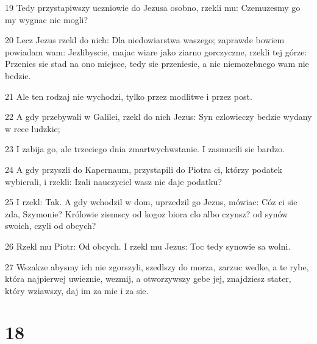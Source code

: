 \par 19 Tedy przystapiwszy uczniowie do Jezusa osobno, rzekli mu: Czemuzesmy go my wygnac nie mogli?
\par 20 Lecz Jezus rzekl do nich: Dla niedowiarstwa waszego; zaprawde bowiem powiadam wam: Jezlibyscie, majac wiare jako ziarno gorczyczne, rzekli tej górze: Przenies sie stad na ono miejsce, tedy sie przeniesie, a nic niemozebnego wam nie bedzie.
\par 21 Ale ten rodzaj nie wychodzi, tylko przez modlitwe i przez post.
\par 22 A gdy przebywali w Galilei, rzekl do nich Jezus: Syn czlowieczy bedzie wydany w rece ludzkie;
\par 23 I zabija go, ale trzeciego dnia zmartwychwstanie. I zasmucili sie bardzo.
\par 24 A gdy przyszli do Kapernaum, przystapili do Piotra ci, którzy podatek wybierali, i rzekli: Izali nauczyciel wasz nie daje podatku?
\par 25 I rzekl: Tak. A gdy wchodzil w dom, uprzedzil go Jezus, mówiac: Cóz ci sie zda, Szymonie? Królowie ziemscy od kogoz biora clo albo czynsz? od synów swoich, czyli od obcych?
\par 26 Rzekl mu Piotr: Od obcych. I rzekl mu Jezus: Toc tedy synowie sa wolni.
\par 27 Wszakze abysmy ich nie zgorszyli, szedlszy do morza, zarzuc wedke, a te rybe, która najpierwej uwieznie, wezmij, a otworzywszy gebe jej, znajdziesz stater, który wziawszy, daj im za mie i za sie.

\chapter{18}

